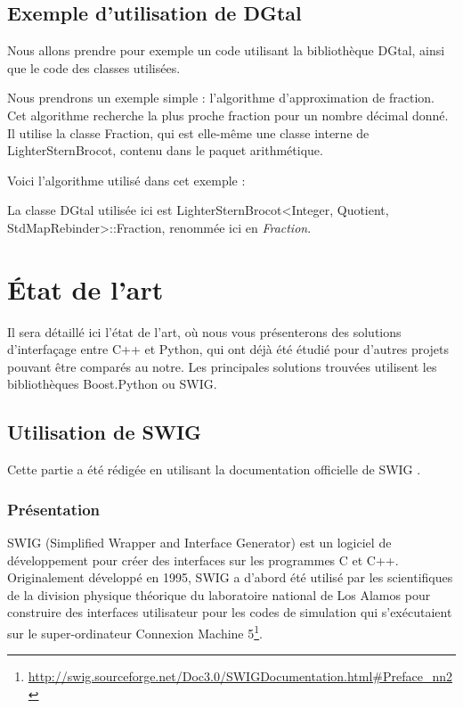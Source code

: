 \documentclass[11pt, french, screen]{report-rd-info}
\begin{document}
\section{Exemple d'utilisation de DGtal}

Nous allons prendre pour exemple un code utilisant la bibliothèque DGtal, ainsi que le code des classes utilisées.

Nous prendrons un exemple simple : l'algorithme d'approximation de fraction. Cet algorithme recherche la plus proche fraction pour un nombre décimal donné.
Il utilise la classe Fraction, qui est elle-même une classe interne de LighterSternBrocot, contenu dans le paquet arithmétique.

Voici l'algorithme utilisé dans cet exemple :



La classe DGtal utilisée ici est LighterSternBrocot<Integer, Quotient, StdMapRebinder>::Fraction, renommée ici en \emph {Fraction}.

\chapter{\'Etat de l'art}
\label{chap:EtatArt}

Il sera détaillé ici l'état de l'art, où nous vous présenterons des solutions d'interfaçage entre C++ et Python, qui ont déjà été étudié pour d'autres projets pouvant être comparés au notre. Les principales solutions trouvées utilisent les bibliothèques Boost.Python ou SWIG.

\section{Utilisation de SWIG}

Cette partie a été rédigée en utilisant la documentation officielle de SWIG \cite{swigmaindoc}.

\subsection{Présentation}

SWIG (Simplified Wrapper and Interface Generator) est un logiciel de développement pour créer des interfaces sur les programmes C et C++. Originalement développé en 1995, SWIG a d'abord été utilisé par les scientifiques de la division physique théorique du laboratoire national de Los Alamos pour construire des interfaces utilisateur pour les codes de simulation qui s'exécutaient sur le super-ordinateur Connexion Machine 5\footnote{ \url{http://swig.sourceforge.net/Doc3.0/SWIGDocumentation.html\#Preface_nn2} }.
\end{document}
